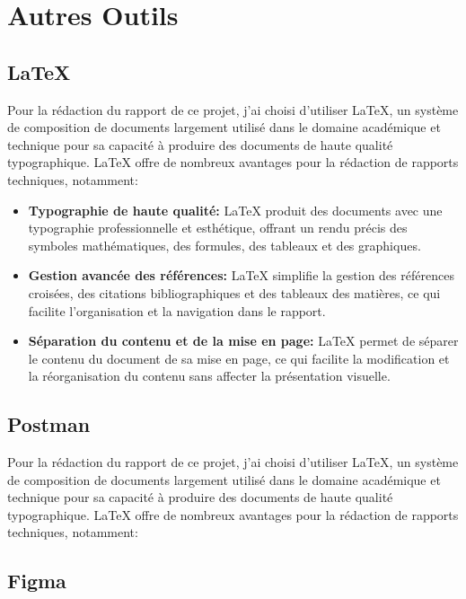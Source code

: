 \section{Autres Outils}

\subsection{\LaTeX}

\hspace{16pt}Pour la rédaction du rapport de ce projet, j'ai choisi d'utiliser \LaTeX, un système de composition de documents largement utilisé dans le domaine académique et technique pour sa capacité à produire des documents de haute qualité typographique. \LaTeX\xspace offre de nombreux avantages pour la rédaction de rapports techniques, notamment:

\begin{itemize}
  \item \textbf{Typographie de haute qualité: }\LaTeX\xspace produit des documents avec une typographie professionnelle et esthétique, offrant un rendu précis des symboles mathématiques, des formules, des tableaux et des graphiques.
  \item \textbf{Gestion avancée des références: }\LaTeX\xspace simplifie la gestion des références croisées, des citations bibliographiques et des tableaux des matières, ce qui facilite l'organisation et la navigation dans le rapport.
  \item \textbf{Séparation du contenu et de la mise en page: }\LaTeX\xspace permet de séparer le contenu du document de sa mise en page, ce qui facilite la modification et la réorganisation du contenu sans affecter la présentation visuelle.
\end{itemize}


\subsection{Postman}

\hspace{16pt}Pour la rédaction du rapport de ce projet, j'ai choisi d'utiliser \LaTeX, un système de composition de documents largement utilisé dans le domaine académique et technique pour sa capacité à produire des documents de haute qualité typographique. \LaTeX\xspace offre de nombreux avantages pour la rédaction de rapports techniques, notamment:


\subsection{Figma}

